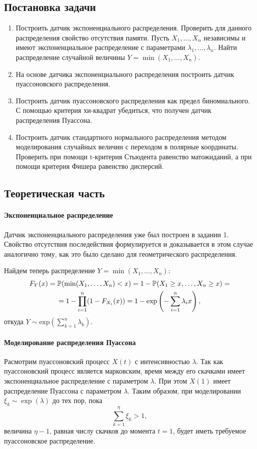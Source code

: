 \documentclass[16pt]{article}
\begin{document}
\subsection{Постановка задачи}
\begin{enumerate}
\item Построить датчик экспоненциального распределения. Проверить для данного распределения свойство отсутствия памяти. Пусть $X_1, \ldots, X_n$ независимы и имеют экспоненциальное распределение с параметрами $\lambda_1, \ldots, \lambda_n$. Найти распределение случайной величины $Y = \min(X_1, \ldots, X_n)$.
\item На основе датчика экспоненциального распределения построить датчик пуассоновского распределения.
\item Построить датчик пуассоновского распределения как предел биномиального. С помощью критерия хи-квадрат убедиться, что получен датчик распределения Пуассона.
\item Построить датчик стандартного нормального распределения методом моделирования случайных величин с переходом в полярные координаты. Проверить при помощи t-критерия Стьюдента равенство матожиданий, а при помощи критерия Фишера равенство дисперсий.
\end{enumerate}

\subsection{Теоретическая часть}
\paragraph{Экспоненциальное распределение}
Датчик экспоненциального распределения уже был построен в задании 1. Свойство отсутствия последействия формулируется и доказывается в этом случае аналогично тому, как это было сделано для геометрического распределения.

Найдем теперь распределение $Y = \min(X_1, \ldots, X_n)$:
\begin{multline}\notag
F_Y(x) = \mathbb{P}(\min(X_1, \ldots, X_n) < x) = 1 - \mathbb{P}(X_1 \geq x, \ldots, X_n \geq x) =\\= 1 - \prod_{i=1}^n(1- F_{X_i}(x)) = 1 -\exp\left(-\sum\limits_{i=1}^n \lambda_i x\right),
\end{multline}
откуда $Y \sim \mathrm{exp}\left(\sum_{k=1}^n \lambda_k\right)$.

\paragraph{Моделирование распределения Пуассона}
Расмотрим пуассоновский процесс $X(t)$ с интенсивностью $\lambda$. Так как пуассоновский процесс является марковским, время между его скачками имеет экспоненциальное распределение с параметром $\lambda$. При этом $X(1)$ имеет распределение Пуассона с параметром $\lambda$. Таким образом, при моделировании $\xi_k \sim \exp(\lambda)$ до тех пор, пока
$$\sum_{k=1}^\eta \xi_k > 1,$$
величина $\eta - 1$, равная числу скачков до момента $t = 1$, будет иметь требуемое пуассоновское распределение.
\end{document}
